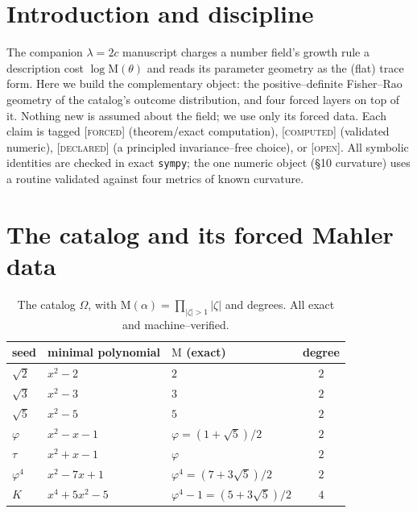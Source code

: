 \documentclass[11pt]{article}
\theoremstyle{definition}
\newcommand{\ph}{\varphi}
\newcommand{\Q}{\mathbb{Q}}
\newcommand{\Mah}{\mathrm{M}}
\newcommand{\forcedtag}{{\scshape [forced]}}
\newcommand{\declaredtag}{{\scshape [declared]}}
\newcommand{\computedtag}{{\scshape [computed]}}
\newcommand{\opentag}{{\scshape [open]}}
\begin{document}
\begin{abstract}
$17/17$, $4/4$, $16/16$, $12/12$, $24/24$, $44/44$, $16/16$, $13/13$, $9/9$, $72/72$, $18/18$, $28/28$, $13/13$, $21/21$, $9/9$; exact
arithmetic over $\Q(\log2,\log3,\log5,\log\ph)$, plus $\log7$ for the extended catalog) verify
every new decision.
\end{abstract}

\section{Introduction and discipline}
The companion $\lambda=2c$ manuscript charges a number field's growth rule a description cost
$\log\Mah(\theta)$ and reads its parameter geometry as the (flat) trace form. Here we build the
complementary object: the positive--definite Fisher--Rao geometry of the catalog's outcome
distribution, and four forced layers on top of it. Nothing new is assumed about the field; we use
only its forced data. Each claim is tagged \forcedtag{} (theorem/exact computation), \computedtag{}
(validated numeric), \declaredtag{} (a principled invariance--free choice), or \opentag. All
symbolic identities are checked in exact \texttt{sympy}; the one numeric object (\S10 curvature)
uses a routine validated against four metrics of known curvature.

\section{The catalog and its forced Mahler data}
\begin{table}[h]\centering
\begin{tabular}{lllc}
\toprule
seed & minimal polynomial & $\Mah$ (exact) & degree\\ \midrule
$\sqrt2$ & $x^2-2$ & $2$ & $2$\\
$\sqrt3$ & $x^2-3$ & $3$ & $2$\\
$\sqrt5$ & $x^2-5$ & $5$ & $2$\\
$\ph$ & $x^2-x-1$ & $\ph=(1+\sqrt5)/2$ & $2$\\
$\tau$ & $x^2+x-1$ & $\ph$ & $2$\\
$\ph^4$ & $x^2-7x+1$ & $\ph^4=(7+3\sqrt5)/2$ & $2$\\
$K$ & $x^4+5x^2-5$ & $\ph^4-1=(5+3\sqrt5)/2$ & $4$\\
\bottomrule
\end{tabular}
\caption{The catalog $\Omega$, with $\Mah(\alpha)=\prod_{|\zeta|>1}|\zeta|$ and degrees. All exact
and machine--verified.}
\end{table}
\end{document}
